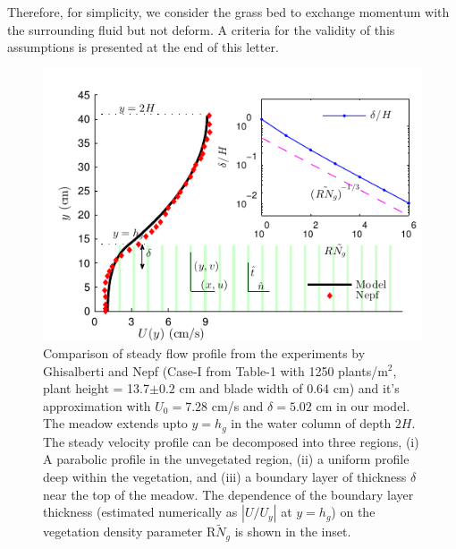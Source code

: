 \documentclass[aps,prl,twocolumn,superscriptaddress,10pt]{revtex4-1}  %
\newcommand{\hg}{h_g}
\newcommand{\Rey}{\text{R}}
\newcommand{\Ndg}{\tilde{N}_g}
\begin{document}
Therefore, for simplicity, we consider the grass bed to exchange momentum with the surrounding fluid but not deform. 
A criteria for the validity of this assumptions is presented at the end of this letter.
\begin{figure}
\includegraphics[scale=1]{Grass_Base_Nepf_shear}
\caption{Comparison of steady flow profile from the experiments by Ghisalberti and Nepf \cite{Nepf04} (Case-I from Table-1 with 1250 plants/m$^2$, 
plant height = 13.7$\pm 0.2$ cm and blade width of 0.64 cm)
 and it's approximation with $U_0=7.28$ cm/s and $\delta = 5.02$ cm in our model. The meadow extends upto $y=h_g$ in the water column of depth $2H$. 
The steady velocity profile can be decomposed into three regions, (i) A parabolic profile in the unvegetated region, (ii) a uniform profile deep within the vegetation, and (iii) a boundary layer of thickness $\delta$ near the top of the meadow. 
The dependence of the boundary layer thickness (estimated numerically as $|U/U_y|$ at $y=\hg$) on the vegetation density parameter $\Rey \Ndg$ is shown in the inset.}
\label{basicflow}
\end{figure}
\end{document}
